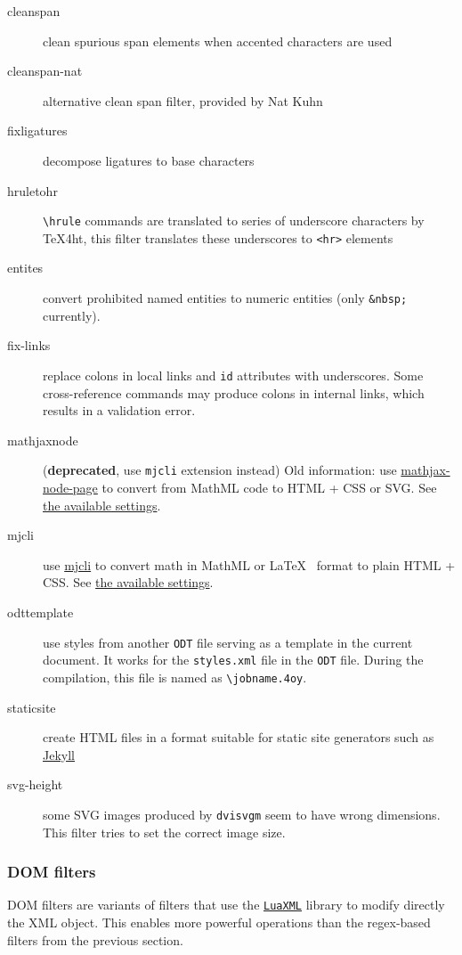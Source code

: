 \begin{description}
\item[cleanspan]
clean spurious span elements when accented characters are used
\item[cleanspan-nat]
alternative clean span filter, provided by Nat Kuhn
\item[fixligatures]
decompose ligatures to base characters
\item[hruletohr]
\texttt{\textbackslash{}hrule} commands are translated to series of
underscore characters by \TeX4ht, this filter translates these
underscores to \texttt{\textless{}hr\textgreater{}} elements
\item[entites]
convert prohibited named entities to numeric entities (only
\texttt{\&nbsp;} currently).
\item[fix-links]
replace colons in local links and \texttt{id} attributes with
underscores. Some cross-reference commands may produce colons in
internal links, which results in a validation error.
\item[mathjaxnode]
(\textbf{deprecated}, use \texttt{mjcli} extension instead) Old
information: use
\href{https://github.com/pkra/mathjax-node-page/}{mathjax-node-page} to
convert from MathML code to HTML + CSS or SVG. See
\hyperref[mathjaxsettings]{the available settings}.
\item[mjcli]
use \href{https://github.com/michal-h21/mjcli}{mjcli} to convert math in
MathML or \LaTeX~ format to plain HTML + CSS. See
\hyperref[mathjaxsettings]{the available settings}.
\item[odttemplate]
use styles from another \texttt{ODT} file serving as a template in the
current document. It works for the \texttt{styles.xml} file in the
\texttt{ODT} file. During the compilation, this file is named as
\texttt{\textbackslash{}jobname.4oy}. \label{sec:odttemplate}
\item[staticsite]
create HTML files in a format suitable for static site generators such
as \href{https://jekyllrb.com/}{Jekyll}
\item[svg-height]
some SVG images produced by \texttt{dvisvgm} seem to have wrong
dimensions. This filter tries to set the correct image size.
\end{description}

\subsubsection{DOM filters}\label{dom-filters}

DOM filters are variants of filters that use the
\href{https://ctan.org/pkg/luaxml}{\texttt{LuaXML}} library to modify
directly the XML object. This enables more powerful operations than the
regex-based filters from the previous section.


